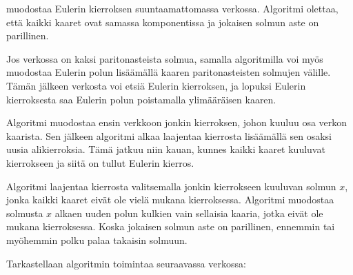  muodostaa Eulerin kierroksen
suuntaamattomassa verkossa.
Algoritmi olettaa, että kaikki kaaret ovat samassa
komponentissa ja jokaisen solmun aste on parillinen.

Jos verkossa on kaksi paritonasteista solmua,
samalla algoritmilla voi myös muodostaa
Eulerin polun lisäämällä kaaren
paritonasteisten solmujen välille.
Tämän jälkeen verkosta voi etsiä Eulerin kierroksen,
ja lopuksi Eulerin kierroksesta saa Eulerin polun
poistamalla ylimääräisen kaaren.

Algoritmi muodostaa ensin verkkoon jonkin kierroksen,
johon kuuluu osa verkon kaarista.
Sen jälkeen algoritmi alkaa laajentaa kierrosta
lisäämällä sen osaksi uusia alikierroksia.
Tämä jatkuu niin kauan, kunnes kaikki kaaret kuuluvat
kierrokseen ja siitä on tullut Eulerin kierros.

Algoritmi laajentaa kierrosta valitsemalla jonkin
kierrokseen kuuluvan solmun $x$,
jonka kaikki kaaret eivät ole vielä mukana kierroksessa.
Algoritmi muodostaa solmusta $x$ alkaen uuden polun
kulkien vain sellaisia kaaria, jotka eivät ole
mukana kierroksessa.
Koska jokaisen solmun aste on parillinen,
ennemmin tai myöhemmin polku palaa takaisin solmuun.

\begin{samepage}
Tarkastellaan algoritmin toimintaa seuraavassa verkossa:
\begin{center}
\end{center}
\end{samepage}

